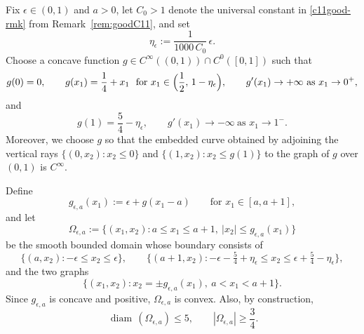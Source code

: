 \documentclass[reqno,11pt]{amsart}
\def\diam{{\mathop\mathrm{\,diam\,}}}
\numberwithin{equation}{section}
\theoremstyle{remark}
\begin{document}
Fix $\epsilon\in(0,1)$ and $a>0$, let $C_0>1$ denote the universal constant in
\eqref{c11good-rmk} from Remark~\ref{rem:goodC11}, and set
\[
\eta_\epsilon:=\frac{1}{1000\,C_0}\,\epsilon.
\]
Choose a concave function $g\in C^\infty((0,1))\cap C^0([0,1])$ such that
\begin{equation}\label{g1}
g(0)=0,\qquad g(x_1)=\frac14+x_1\ \ \text{for }x_1\in\Bigl(\frac12,\,1-\eta_\epsilon\Bigr),
\qquad g'(x_1)\to +\infty \ \text{as }x_1\to 0^+,
\end{equation}
and
\begin{equation}\label{g2}
g(1)=\frac54-\eta_\epsilon,
\qquad g'(x_1)\to -\infty \ \text{as }x_1\to 1^-.
\end{equation}
Moreover, we choose $g$ so that the embedded curve obtained by adjoining the vertical rays
$\{(0,x_2): x_2\le 0\}$ and $\{(1,x_2): x_2\le g(1)\}$ to the graph of $g$ over $(0,1)$ is $C^\infty$.

Define
\[
g_{\epsilon,a}(x_1):=\epsilon+g(x_1-a)\qquad\text{for }x_1\in[a,a+1],
\]
and let
\[
\Omega_{\epsilon,a}:=\{(x_1,x_2): a\le x_1\le a+1,\ |x_2|\le g_{\epsilon,a}(x_1)\}
\]
be the smooth bounded domain whose boundary consists of
\[
\{(a,x_2): -\epsilon\le x_2\le \epsilon\},\qquad
\{(a+1,x_2): -\epsilon-\tfrac54+\eta_\epsilon\le x_2\le \epsilon+\tfrac54-\eta_\epsilon\},
\]
and the two graphs
\[
\{(x_1,x_2): x_2=\pm g_{\epsilon,a}(x_1),\ a<x_1<a+1\}.
\]
Since $g_{\epsilon,a}$ is concave and positive, $\Omega_{\epsilon,a}$ is convex. Also, by construction,
\begin{equation}\label{diam-bound}
\diam(\Omega_{\epsilon,a})\le 5,\qquad |\Omega_{\epsilon,a}|\ge \frac34.
\end{equation}
\end{document}
